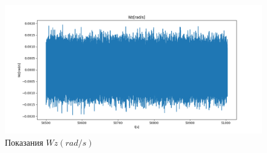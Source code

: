 \documentclass[a4paper,14pt]{article}
\theoremstyle{plain} %
\theoremstyle{definition} %
\theoremstyle{remark} %
\begin{document}
{\begin{figure}[h!]
    \centering
    \includegraphics[width=0.99\linewidth]{Wz.png}
    \caption{Показания $Wz(rad/s)$}
    \label{fig:wz}
\end{figure}

}
\end{document}
